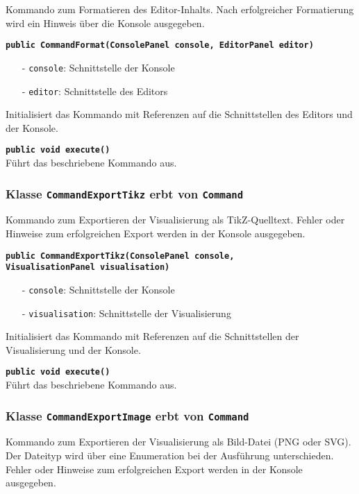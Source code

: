 \documentclass[parskip=full,11pt,twoside]{scrartcl}
\begin{document}
Kommando zum Formatieren des Editor-Inhalts. Nach erfolgreicher Formatierung wird ein Hinweis über die Konsole ausgegeben.

\textbf{\texttt{public CommandFormat(ConsolePanel console, EditorPanel editor)}}
\begin{itemize}[noitemsep]
	\item[-] \texttt{console}: Schnittstelle der Konsole
	\item[-] \texttt{editor}: Schnittstelle des Editors
\end{itemize}
Initialisiert das Kommando mit Referenzen auf die Schnittstellen des Editors und der Konsole.

\textbf{\texttt{public void execute()}}\\
Führt das beschriebene Kommando aus.

\subsubsection{Klasse \texttt{CommandExportTikz} erbt von \texttt{Command}}

Kommando zum Exportieren der Visualisierung als TikZ-Quelltext. Fehler oder Hinweise zum erfolgreichen Export werden in der Konsole ausgegeben.

\textbf{\texttt{public CommandExportTikz(ConsolePanel console,\\VisualisationPanel visualisation)}}
\begin{itemize}[noitemsep]
	\item[-] \texttt{console}: Schnittstelle der Konsole
	\item[-] \texttt{visualisation}: Schnittstelle der Visualisierung
\end{itemize}
Initialisiert das Kommando mit Referenzen auf die Schnittstellen der Visualisierung und der Konsole.

\textbf{\texttt{public void execute()}}\\
Führt das beschriebene Kommando aus.

\subsubsection{Klasse \texttt{CommandExportImage} erbt von \texttt{Command}}

Kommando zum Exportieren der Visualisierung als Bild-Datei (PNG oder SVG). Der Dateityp wird über eine Enumeration bei der Ausführung unterschieden. Fehler oder Hinweise zum erfolgreichen Export werden in der Konsole ausgegeben.
\end{document}
